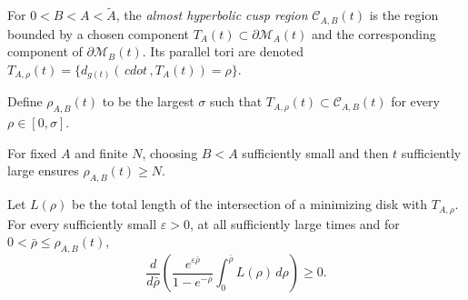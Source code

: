 \begin{definition}
\label{def:chow-iv-almost-hyperbolic-cusp-region}

For \(0<B<A<\widetilde A\), the \emph{almost hyperbolic cusp region}
\(\mathcal C_{A,B}(t)\) is the region bounded by a chosen component
\(T_A(t)\subset\partial\mathcal M_A(t)\) and the corresponding component of
\(\partial\mathcal M_B(t)\).  Its parallel tori are denoted
\(T_{A,\rho}(t)=\{d_{g(t)}(\,cdot\,,T_A(t))=\rho\}\).
\end{definition}

\begin{definition}
\label{def:chow-iv-almost-cusp-depth}


Define \(\rho_{A,B}(t)\) to be the largest \(\sigma\) such that
\(T_{A,\rho}(t)\subset\mathcal C_{A,B}(t)\) for every
\(\rho\in[0,\sigma]\).
\end{definition}

\begin{remark}
\label{rem:chow-iv-almost-cusps-arbitrary-depth}


For fixed \(A\) and finite \(N\), choosing \(B<A\) sufficiently small and then
\(t\) sufficiently large ensures \(\rho_{A,B}(t)\ge N\).
\end{remark}

\begin{lemma}
\label{lem:chow-iv-cusp-length-monotonicity}


Let \(L(\rho)\) be the total length of the intersection of a minimizing disk
with \(T_{A,\rho}\).  For every sufficiently small \(\varepsilon>0\), at all
sufficiently large times and for \(0<\bar\rho\le\rho_{A,B}(t)\),
\[
 \frac d{d\bar\rho}\left(
 \frac{e^{\varepsilon\bar\rho}}{1-e^{-\bar\rho}}
 \int_0^{\bar\rho}L(\rho)\,d\rho\right)\ge0.
\]
\end{lemma}

